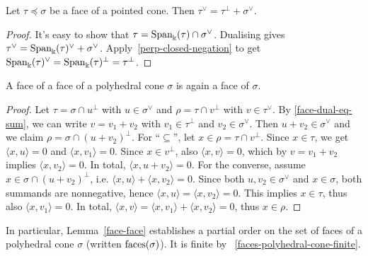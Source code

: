 \begin{lemma}
  \label{face-dual-eq-sum}
  \lean{}
  \leanok
  Let \( \tau \preceq \sigma \) be a face of a pointed cone. Then \(
  \tau^{\vee} = \tau^{\perp} + \sigma^{\vee} \).
\end{lemma}
\begin{proof}
  \leanok
  It's easy to show that \( \tau = \operatorname{Span}_{\Bbbk}(\tau) \cap
  \sigma^{\vee} \). Dualising gives \( \tau^{\vee} =
  \operatorname{Span}_{\Bbbk}(\tau)^{\vee} + \sigma^{\vee} \).
  Apply~\ref{perp-closed-negation} to get \(
  \operatorname{Span}_{\Bbbk}(\tau)^{\vee} = \operatorname{Span}_{\Bbbk}(\tau)^{\perp} =
  \tau^{\perp} \).
\end{proof}


\begin{lemma}
  \label{face-face}
  \leanok
  A face of a face of a polyhedral cone \( \sigma \) is again a face
  of \( \sigma \).
\end{lemma}
\begin{proof}
  \leanok
  Let \( \tau = \sigma \cap u^{\perp} \) with \( u \in \sigma^{\vee}
  \) and \( \rho = \tau \cap v^{\perp} \) with \( v \in \tau^{\vee}
  \). By \ref{face-dual-eq-sum}, we can write \( v = v_1 + v_2 \)
  with \( v_1 \in \tau^{\perp} \) and \( v_2 \in \sigma^{\vee} \).
  Then \( u + v_2 \in \sigma^{\vee} \) and we claim \( \rho = \sigma
  \cap (u + v_2)^{\perp} \). For ``\( \subseteq \)'', let \( x \in
  \rho = \tau \cap v^{\perp} \). Since \( x \in \tau \), we get \(
  \langle x, u \rangle = 0 \) and \( \langle x, v_1 \rangle = 0 \).
  Since \( x \in v^{\perp} \), also \( \langle x, v \rangle = 0 \),
  which by \( v = v_1 + v_2 \) implies \( \langle x, v_2 \rangle = 0
  \). In total, \( \langle x, u + v_2 \rangle = 0 \). For the
  converse, assume \( x \in \sigma \cap (u + v_2)^{\perp} \), i.e. \(
  \langle x, u \rangle + \langle x, v_2 \rangle = 0 \). Since both \(
  u, v_2 \in \sigma^{\vee} \) and \( x \in \sigma \), both summands
  are nonnegative, hence \( \langle x, u \rangle = \langle x, v_2
  \rangle = 0 \). This implies \( x \in \tau \), thus also \( \langle
  x, v_1 \rangle = 0 \). In total, \( \langle x, v \rangle = \langle
  x, v_1 \rangle + \langle x, v_2 \rangle = 0 \), thus \( x \in \rho
  \).
\end{proof}

In particular, Lemma~\ref{face-face} establishes a partial order on
the set of faces of a polyhedral cone \( \sigma \) (written \(
\operatorname{faces}(\sigma) \)). It is finite by
~\ref{faces-polyhedral-cone-finite}.


